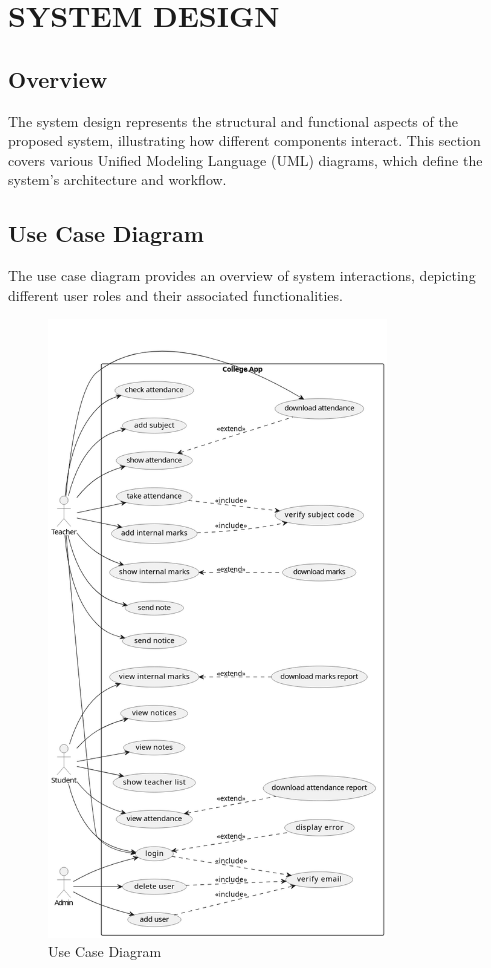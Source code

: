 \chapter{SYSTEM DESIGN}

\section{Overview}
The system design represents the structural and functional aspects of the proposed system, illustrating how different components interact. This section covers various Unified Modeling Language (UML) diagrams, which define the system's architecture and workflow.

\section{Use Case Diagram}
The use case diagram provides an overview of system interactions, depicting different user roles and their associated functionalities.

\begin{figure}[H]
    \centering
    \includegraphics[width=0.8\textwidth]{Graphics/usecase_diagarm.png}
    \caption{Use Case Diagram}
    \label{fig:use_case_diagram}
\end{figure}

